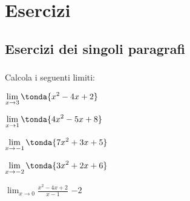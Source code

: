 
\section{Esercizi}

\subsection{Esercizi dei singoli paragrafi}

\subsubsection*{}

\begin{esercizio}\label{ese:03.1}
Calcola i seguenti limiti:
\begin{multicols}{2}
 \begin{enumeratea}
  \item \(\displaystyle \lim_{x \rightarrow 3} \tonda{x^2-4x+2}\)
  \item \(\displaystyle \lim_{x \rightarrow 1} \tonda{4x^2-5x+8}\)
  \item \(\displaystyle \lim_{x \rightarrow -1} \tonda{7x^2+3x+5}\)
  \item \(\displaystyle \lim_{x \rightarrow -2} \tonda{3x^2+2x+6}\)
  \item \(\displaystyle \lim_{x \rightarrow 0} \frac{x^2-4x+2}{x-1}\)
  \hfill \(-2\)
 \end{enumeratea}
 \end{multicols}
\end{esercizio}

